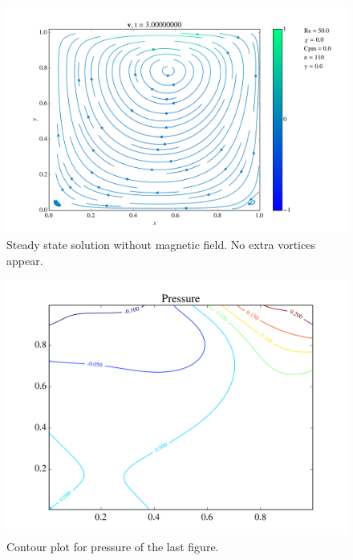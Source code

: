 \documentclass[journal]{IEEEtran}
\begin{document}
\begin{figure}[!t]
\centering
\includegraphics[width=\linewidth]{figures/Re050/n/vectorField}
\caption{Steady state solution without magnetic field. No extra vortices appear. \label{Re050nVectorField}}
\end{figure}

\begin{figure}[!t]
\centering
\includegraphics[width=\linewidth]{figures/Re050/n/pressure}
\caption{Contour plot for pressure of the last figure. \label{Re050nPressure}}
\end{figure}
\end{document}
